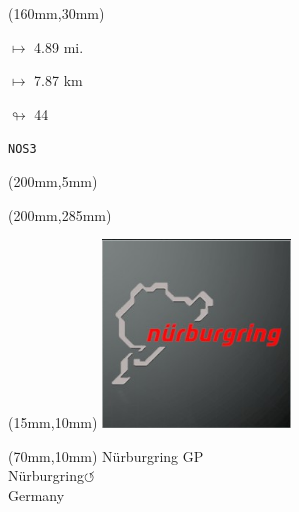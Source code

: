 \begin{textblock*}{40mm}(160mm,30mm)%
\Large
\par$\mapsto$ 4.89 mi.
\par$\mapsto$ 7.87 km
\par$\looparrowright$ 44
\par\hfill\tiny\tt NOS3\\
\end{textblock*}
\begin{textblock*}{20mm}(200mm,5mm)%
\fbox{\thepage}
\label{NOS3}
\end{textblock*}
\begin{textblock*}{20mm}(200mm,285mm)%
\fbox{\thepage}
\end{textblock*}

\null\newpage
\begin{textblock*}{50mm}(15mm,10mm)%
\includegraphics[width=50mm]{LG/2015-05-20_00089.png}
\end{textblock*}
\begin{textblock*}{130mm}(70mm,10mm)%
{\fontsize{20}{20}\selectfont Nürburgring GP\\}
{\fontsize{16}{16}\selectfont Nürburgring\hfill \huge$\circlearrowleft$\\}
{\fontsize{12}{12}\selectfont Germany\\}
\end{textblock*}
